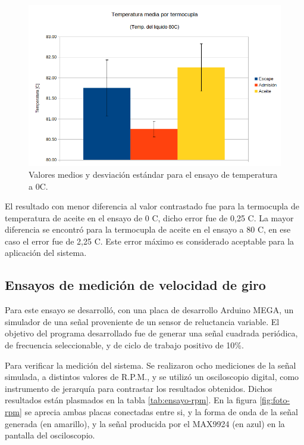 \begin{figure}[htpb]
\centering
\includegraphics[width=.9\textwidth]{./Figures/temp-80c.png}
\caption{Valores medios y desviación estándar para el ensayo de temperatura a 0C.}
\label{fig:temp-80c}
\end{figure}

El resultado con menor diferencia al valor contrastado fue para la termocupla de temperatura de aceite en el ensayo de 0 \degree C, dicho error fue de 0,25 \degree C. La mayor diferencia se encontró para la termocupla de aceite en el ensayo a 80 \degree C, en ese caso el error fue de 2,25 \degree C. Este error máximo es considerado aceptable para la aplicación del sistema.

\break

\subsection{Ensayos de medición de velocidad de giro}

Para este ensayo se desarrolló, con una placa de desarrollo Arduino MEGA, un simulador de una señal proveniente de un sensor de reluctancia variable. El objetivo del programa desarrollado fue de generar una señal cuadrada periódica, de frecuencia seleccionable, y de ciclo de trabajo positivo de 10\%.

Para verificar la medición del sistema. Se realizaron ocho mediciones de la señal simulada, a distintos valores de R.P.M., y se utilizó un osciloscopio digital, como instrumento de jerarquía para contrastar los resultados obtenidos. Dichos resultados están plasmados en la tabla \ref{tab:ensayo-rpm}. En la figura \ref{fig:foto-rpm} se aprecia ambas placas conectadas entre si, y la forma de onda de la señal generada (en amarillo), y la señal producida por el MAX9924 (en azul) en la pantalla del osciloscopio.

